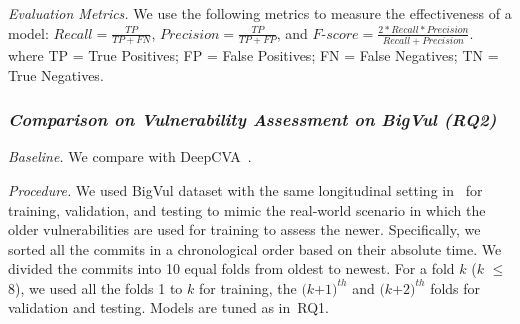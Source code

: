 \emph{Evaluation Metrics.} We use the following metrics to measure the
effectiveness of a model: $Recall = \frac{TP}{TP+FN}$, $Precision =
\frac{TP}{TP+FP}$, and $F$-$score =
\frac{2*Recall*Precision}{Recall+Precision}$.
where TP = True Positives; FP = False Positives; FN = False Negatives; TN = True Negatives.


\subsubsection{\bf \em Comparison on Vulnerability Assessment on BigVul (RQ2)}

{\em Baseline.} We compare {\tool} with DeepCVA~\cite{deepCVA-ase21}.


{\em Procedure.} We used BigVul dataset with the same
longitudinal setting in~\cite{deepCVA-ase21,falessi2020need} for
training, validation, and testing to mimic the real-world scenario in
which the older vulnerabilities are used for training to assess the
newer. Specifically, we sorted all the commits in a chronological
order based on their absolute time. We divided the commits into 10
equal folds from oldest to newest. For a fold $k$ ($k$ $\le$ $8$), we
used all the folds 1 to $k$ for training, the $(k$+$1)^{th}$ and
$(k$+$2)^{th}$ folds for validation and testing. Models are tuned as
in~RQ1.



